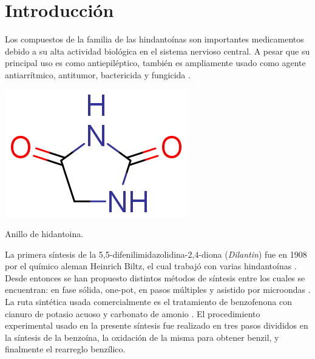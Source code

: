 \documentclass[fleqn,10pt]{SelfArx}
\begin{document}
\flushbottom %

\maketitle %


\thispagestyle{empty} %




\section*{Introducci\'on} %
Los compuestos de la familia de las hindanto\'inas son importantes medicamentos debido a su alta actividad biol\'ogica en el sistema nervioso central. A pesar que su principal uso es como antiepil\'eptico, tambi\'en es ampliamente usado como agente antiarr\'itmico, antitumor, bactericida y fungicida \cite{safari2010}\cite{ildiz2012}\cite{hayward1983}.
\begin{scheme}[h]
	\centering
	\includegraphics[width=0.3\linewidth]{structures/hydantoin.png}
	\caption{Anillo de hidantoina.}
\end{scheme}

La primera s\'intesis de la 5,5-difenilimidazolidina-2,4-diona (\textit{Dilantin}) fue en 1908 por el qu\'imico aleman Heinrich Biltz, el cual trabaj\'o con varias hindanto\'inas \cite{hayward1983}\cite{aicardi2007}. Desde entonces se han propuesto distintos m\'etodos de s\'intesis entre los cuales se encuentran: en fase s\'olida, one-pot, en pasos m\'ultiples y asistido por microondas \cite{safari2010}. La ruta sint\'etica usada comercialmente es el tratamiento de benzofenona con cianuro de potasio acuoso y carbonato de amonio \cite{hayward1983}. El procedimiento experimental usado en la presente s\'intesis fue realizado en tres pasos divididos en la s\'intesis de la benzo\'ina, la oxidaci\'on de la misma para obtener benzil, y finalmente el rearreglo benz\'ilico.
\end{document}
